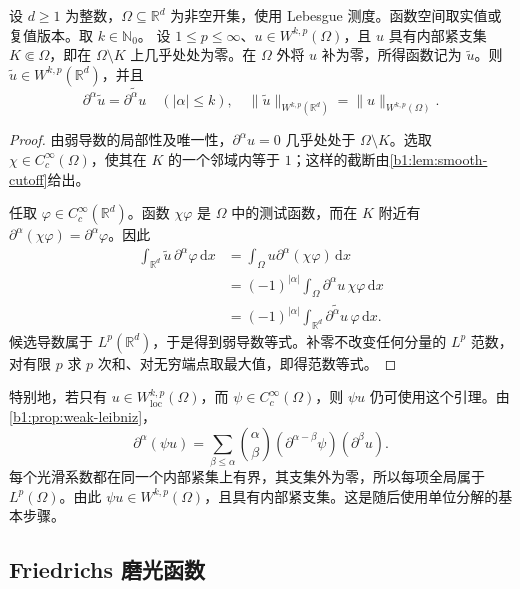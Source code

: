 \begin{lemma}\label{b1:lem:compact-sobolev-zero-extension}
设 \(d\geq1\) 为整数，\(\Omega\subseteq\mathbb R^d\) 为非空开集，使用 Lebesgue 测度。函数空间取实值或复值版本。取 \(k\in\mathbb N_0\)。
设 \(1\leq p\leq\infty\)、\(u\in W^{k,p}(\Omega)\)，且 \(u\) 具有内部紧支集 \(K\Subset\Omega\)，即在 \(\Omega\setminus K\) 上几乎处处为零。在 \(\Omega\) 外将 \(u\) 补为零，所得函数记为 \(\widetilde u\)。则 \(\widetilde u\in W^{k,p}(\mathbb R^d)\)，并且
\begin{equation}\label{b1:eq:compact-sobolev-zero-extension}
 \partial^\alpha\widetilde u=\widetilde{\partial^\alpha u}
 \quad(|\alpha|\leq k),
 \quad
 \|\widetilde u\|_{W^{k,p}(\mathbb R^d)}
 =\|u\|_{W^{k,p}(\Omega)}.
\end{equation}
\end{lemma}
\begin{proof}
由弱导数的局部性及唯一性，\(\partial^\alpha u=0\) 几乎处处于 \(\Omega\setminus K\)。选取 \(\chi\in C_c^\infty(\Omega)\)，使其在 \(K\) 的一个邻域内等于 \(1\)；这样的截断由\cref{b1:lem:smooth-cutoff}给出。

任取 \(\varphi\in C_c^\infty(\mathbb R^d)\)。函数 \(\chi\varphi\) 是 \(\Omega\) 中的测试函数，而在 \(K\) 附近有 \(\partial^\alpha(\chi\varphi)=\partial^\alpha\varphi\)。因此
\[
 \begin{aligned}
 \int_{\mathbb R^d}\widetilde u\,\partial^\alpha\varphi\,\mathrm dx
 &=\int_\Omega u\partial^\alpha(\chi\varphi)\,\mathrm dx\\
 &=(-1)^{|\alpha|}\int_\Omega\partial^\alpha u\,\chi\varphi\,\mathrm dx\\
 &=(-1)^{|\alpha|}\int_{\mathbb R^d}
        \widetilde{\partial^\alpha u}\,\varphi\,\mathrm dx.
 \end{aligned}
\]
候选导数属于 \(L^p(\mathbb R^d)\)，于是得到弱导数等式。补零不改变任何分量的 \(L^p\) 范数，对有限 \(p\) 求 \(p\) 次和、对无穷端点取最大值，即得范数等式。
\end{proof}

特别地，若只有 \(u\in W^{k,p}_{\mathrm{loc}}(\Omega)\)，而 \(\psi\in C_c^\infty(\Omega)\)，则 \(\psi u\) 仍可使用这个引理。由\cref{b1:prop:weak-leibniz}，
\[
 \partial^\alpha(\psi u)
 =\sum_{\beta\leq\alpha}\binom\alpha\beta
       (\partial^{\alpha-\beta}\psi)(\partial^\beta u).
\]
每个光滑系数都在同一个内部紧集上有界，其支集外为零，所以每项全局属于 \(L^p(\Omega)\)。由此 \(\psi u\in W^{k,p}(\Omega)\)，且具有内部紧支集。这是随后使用单位分解的基本步骤。

\subsection{Friedrichs 磨光函数}
\label{b1:subsec:220102}

